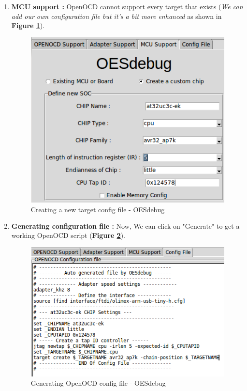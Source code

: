 \begin{enumerate}
\begin{enumerate}
		\item \textbf{MCU support : } OpenOCD cannot support every target that exists (\textit{We can add our own configuration file but it's a bit more enhanced} as shown in \textbf{Figure \ref{Creating a new target config file - OESdebug}}).
		\begin{figure}[H]
			\centering
        	\includegraphics[scale=0.32]{img/solution/OESdebug-new-board.png}
        	\caption{Creating a new target config file - OESdebug}
        	\label{Creating a new target config file - OESdebug}
    	\end{figure}
    			
		\item \textbf{Generating configuration file : } Now, We can click on "Generate" to get a working OpenOCD script (\textbf{Figure \ref{Generating OpenOCD config file - OESdebug}}).
		\begin{figure}[H]
			\centering
        	\includegraphics[scale=0.32]{img/solution/OESdebug-generatedScript.png}
        	\caption{Generating OpenOCD config file - OESdebug}
        	\label{Generating OpenOCD config file - OESdebug}
    	\end{figure}		
		
		
	\end{enumerate}
		
\end{enumerate}
	



